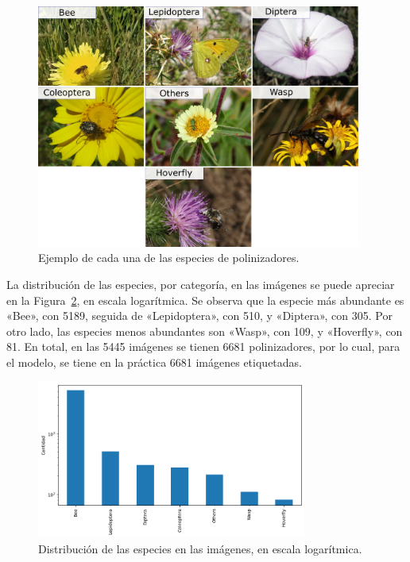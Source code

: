 \begin{figure}[H]
    \centering
    \includegraphics[width=0.95\textwidth]{Figuras/ejemplos.png}
    \caption{Ejemplo de cada una de las especies de polinizadores.}
    \label{fig:especies}
\end{figure}

La distribución de las especies, por categoría, en las imágenes se puede apreciar en la Figura~\ref{fig:distribucion_especies}, en escala logarítmica. Se observa que la especie más abundante es «Bee», con 5189, seguida de «Lepidoptera», con 510, y «Diptera», con 305. Por otro lado, las especies menos abundantes son «Wasp», con 109, y «Hoverfly», con 81. En total, en las 5445 imágenes se tienen 6681 polinizadores, por lo cual, para el modelo, se tiene en la práctica 6681 imágenes etiquetadas.

\begin{figure}[H]
    \centering
    \includegraphics[width=0.79\textwidth]{Figuras/distribucion_especies.png}
    \caption{Distribución de las especies en las imágenes, en escala logarítmica.}
    \label{fig:distribucion_especies}
\end{figure}

